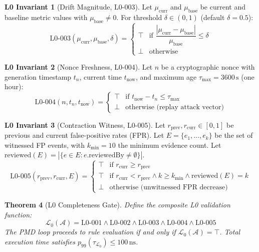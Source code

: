 \documentclass[12pt,a4paper]{article}
\newtheorem{theorem}{Theorem}[section]
\theoremstyle{definition}
\newtheorem{invariant}[theorem]{L0 Invariant}
\theoremstyle{remark}
\begin{document}
\begin{invariant}[Drift Magnitude, L0-003]
\label{inv:drift}
Let $\mu_{\text{curr}}$ and $\mu_{\text{base}}$ be current and baseline
metric values with $\mu_{\text{base}} \neq 0$. For threshold $\delta \in (0,1)$
(default $\delta = 0.5$):
\[
  \text{L0-003}(\mu_{\text{curr}}, \mu_{\text{base}}, \delta) = \begin{cases}
    \top & \text{if } \dfrac{|\mu_{\text{curr}} - \mu_{\text{base}}|}{\mu_{\text{base}}} \leq \delta \\[6pt]
    \bot & \text{otherwise}
  \end{cases}
\]
\end{invariant}

\begin{invariant}[Nonce Freshness, L0-004]
\label{inv:nonce}
Let $n$ be a cryptographic nonce with generation timestamp $t_n$,
current time $t_{\text{now}}$, and maximum age $\tau_{\max} = 3600\,\text{s}$
(one hour):
\[
  \text{L0-004}(n, t_n, t_{\text{now}}) = \begin{cases}
    \top & \text{if } t_{\text{now}} - t_n \leq \tau_{\max} \\
    \bot & \text{otherwise (replay attack vector)}
  \end{cases}
\]
\end{invariant}

\begin{invariant}[Contraction Witness, L0-005]
\label{inv:contraction}
Let $r_{\text{prev}}, r_{\text{curr}} \in [0,1]$ be previous and current
false-positive rates (FPR). Let $E = \{e_1, \ldots, e_k\}$ be the set of
witnessed FP events, with $k_{\min} = 10$ the minimum evidence count.
Let $\text{reviewed}(E) = |\{e \in E : e.\text{reviewedBy} \neq \emptyset\}|$.
\[
  \text{L0-005}(r_{\text{prev}}, r_{\text{curr}}, E) = \begin{cases}
    \top & \text{if } r_{\text{curr}} \geq r_{\text{prev}} \\
    \top & \text{if } r_{\text{curr}} < r_{\text{prev}} \wedge k \geq k_{\min}
           \wedge \text{reviewed}(E) = k \\
    \bot & \text{otherwise (unwitnessed FPR decrease)}
  \end{cases}
\]
\end{invariant}

\begin{theorem}[L0 Completeness Gate]
\label{thm:l0-gate}
Define the composite L0 validation function:
\[
  \mathcal{L}_0(\mathcal{A}) = \text{L0-001} \wedge \text{L0-002} \wedge
  \text{L0-003} \wedge \text{L0-004} \wedge \text{L0-005}
\]
The PMD loop proceeds to rule evaluation if and only if $\mathcal{L}_0(\mathcal{A}) = \top$.
Total execution time satisfies $p_{99}(\tau_{\mathcal{L}_0}) \leq 100\,\text{ns}$.
\end{theorem}
\end{document}
